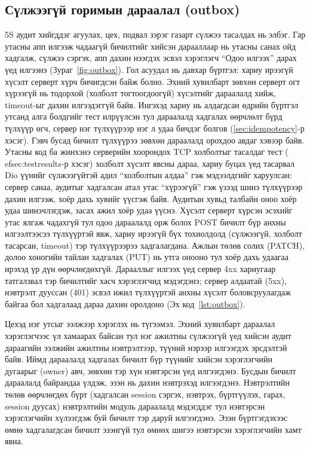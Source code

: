 \subsection{Сүлжээгүй горимын дараалал (outbox)}
5S аудит хийгддэг агуулах, цех, подвал зэрэг газарт сүлжээ тасалдах нь элбэг. Гар утасны апп илгээж чадаагүй бичилтийг хийсэн дарааллаар нь утасны санах ойд хадгалж, сүлжээ сэргэх, апп дахин нээгдэх эсвэл хэрэглэгч ``Одоо илгээх'' дарах үед илгээнэ (Зураг~\ref{fig:outbox}). Гол асуудал нь давхар бүртгэл: хариу ирээгүй хүсэлт серверт хүрч бичигдсэн байж болно. Эхний хувилбарт зөвхөн серверт огт хүрээгүй нь тодорхой (холболт тогтоогдоогүй) хүсэлтийг дараалалд хийж, timeout-ыг дахин илгээдэггүй байв. Ингэхэд хариу нь алдагдсан өдрийн бүртгэл утсанд алга болдгийг тест илрүүлсэн тул дараалалд хадгалах өөрчлөлт бүрд түлхүүр өгч, сервер нэг түлхүүрээр нэг л удаа бичдэг болгов (\ref{sec:idempotency}-р хэсэг). Гэвч бусад бичилт түлхүүрээ зөвхөн дараалалд орохдоо авдаг хэвээр байв. Утасны код ба жинхэнэ серверийн хоорондох TCP холболтыг тасалдаг тест (
ef{sec:testresults}-р хэсэг) холболт хүсэлт явсны дараа, хариу буцах үед тасарвал Dio үүнийг сүлжээгүйтэй адил ``холболтын алдаа'' гэж мэдээлдгийг харуулсан: сервер санаа, аудитыг хадгалсан атал утас ``хүрээгүй'' гэж үзээд шинэ түлхүүрээр дахин илгээж, хоёр дахь хувийг үүсгэж байв. Аудитын хувьд талбайн оноо хоёр удаа шинэчлэгдэж, засах ажил хоёр удаа үүснэ. Хүсэлт серверт хүрсэн эсэхийг утас ялгаж чадахгүй тул одоо дараалалд орж болох POST бичилт бүр анхны илгээлтээсээ түлхүүртэй явж, хариу ирээгүй бүх тохиолдолд (сүлжээгүй, холболт тасарсан, timeout) тэр түлхүүрээрээ хадгалагдана. Ажлын төлөв солих (PATCH), долоо хоногийн тайлан хадгалах (PUT) нь утга онооно тул хоёр дахь удаагаа ирэхэд үр дүн өөрчлөгдөхгүй. Дарааллыг илгээх үед сервер 4xx хариугаар татгалзвал тэр бичилтийг хасч хэрэглэгчид мэдэгдэнэ; сервер алдаатай (5xx), нэвтрэлт дууссан (401) эсвэл ижил түлхүүртэй анхны хүсэлт боловсруулагдаж байгаа бол хадгалаад дараа дахин оролдоно (Эх код~\ref{lst:outbox}).

Цехэд нэг утсыг ээлжээр хэрэглэх нь түгээмэл. Эхний хувилбарт дараалал хэрэглэгчээс үл хамаарах байсан тул нэг ажилтны сүлжээгүй үед хийсэн аудит дараагийн ээлжийн ажилтны нэвтрэлтээр, түүний нэрээр илгээгдэх эрсдэлтэй байв. Иймд дараалалд хадгалах бичилт бүр түүнийг хийсэн хэрэглэгчийн дугаарыг (owner) авч, зөвхөн тэр хүн нэвтэрсэн үед илгээгдэнэ. Бусдын бичилт дараалалд байрандаа үлдэж, эзэн нь дахин нэвтрэхэд илгээгдэнэ. Нэвтрэлтийн төлөв өөрчлөгдөх бүрт (хадгалсан session сэргэх, нэвтрэх, бүртгүүлэх, гарах, session дуусах) нэвтрэлтийн модуль дараалалд мэдэгддэг тул нэвтэрсэн хэрэглэгчийн хүлээгдэж буй бичилт тэр даруй илгээгдэнэ. Эзэн бүртгэгдэхээс өмнө хадгалагдсан бичилт эзэнгүй тул өмнөх шигээ нэвтэрсэн хэрэглэгчийн хамт явна.

